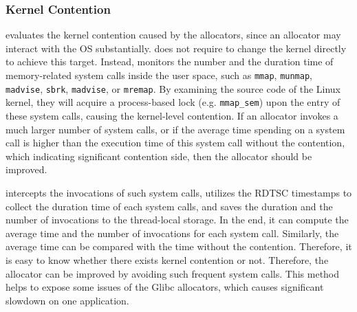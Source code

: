 
\subsubsection{Kernel Contention}
\MP{} evaluates the kernel contention caused by the allocators, since an allocator may interact with the OS substantially. \MP{} does not require to change the kernel directly to achieve this target. Instead, \MP{} monitors the number and the duration time of memory-related system calls inside the user space, such as \texttt{mmap}, \texttt{munmap}, \texttt{madvise}, \texttt{sbrk}, \texttt{madvise}, or \texttt{mremap}. By examining the source code of the Linux kernel, they will acquire a process-based lock (e.g. \texttt{mmap\_sem}) upon the entry of these system calls, causing the kernel-level contention. If an allocator invokes a much larger number of system calls,  or if the average time spending on a system call is higher than the execution time of this system call without the contention, which indicating significant contention side, then the allocator should be improved. 

\MP{} intercepts the invocations of such system calls, utilizes the RDTSC timestamps to collect the duration time of each system calls, and saves the duration and the number of invocations to the thread-local storage. In the end, it can compute the average time and the number of invocations for each system call. Similarly, the average time can be compared with the time without the contention. Therefore, it is easy to know whether there exists kernel contention or not. Therefore, the allocator can be improved by avoiding such frequent system calls. This method helps to expose some issues of the Glibc allocators, which causes significant slowdown on one application. 

  

\begin{comment}
   the information can be utilized to tell whether an allocator has significant  
As we all know, memory allocators may invoke multiple system calls inside allocation and deallocation. 
User space contention:
How many separate locks are explicitly utilized? 
How many lock acquisitions? How much time are spending on lock waiting for each thread, and in total?

How much time spending on kernel-space contention? For instance, we could infer from memory-related system calls, such as mmap, munmap, madvise, brk, or something else? 

That is, we may have to integrate with SyncPerf for doing this. We will borrow their implementation in order to do this. 
\end{comment}

